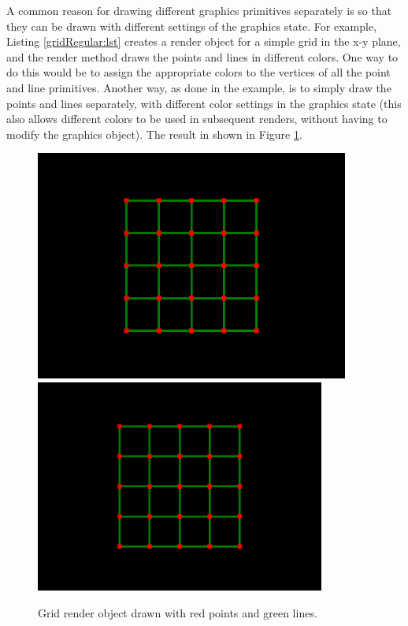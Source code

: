A common reason for drawing different graphics primitives separately
is so that they can be drawn with different settings of the graphics
state. For example, Listing \ref{gridRegular:lst} creates a render
object for a simple grid in the x-y plane, and the render method draws the
points and lines in different colors. One way to do this would be to
assign the appropriate colors to the vertices of all the point and
line primitives.  Another way, as done in the example, is to simply
draw the points and lines separately, with different color settings in
the graphics state (this also allows different colors to be used in
subsequent renders, without having to modify the graphics object).
The result in shown in Figure \ref{gridRegular:fig}.
%
\begin{figure}[t]
\begin{center}
\iflatexml
 \includegraphics[]{images/gridRegular}
\else
 \includegraphics[width=3.75in]{images/gridRegular}
\fi
\end{center}
\caption{Grid render object drawn with red points and green lines.}
\label{gridRegular:fig}
\end{figure}
%
%

